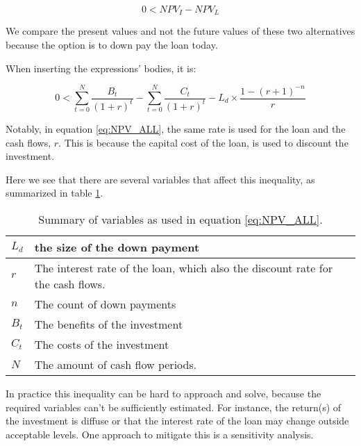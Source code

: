 \documentclass[a4paper]{article}
\begin{document}
\begin{equation}
0 < NPV_I - NPV_L
\end{equation}

We compare the present values and not the future values of these two
alternatives because the option is to down pay the loan today.

When inserting the expressions' bodies, it is:

\begin{equation}
\label{eq:NPV_ALL}
0 < {\sum_{t=0}^{N} \frac{B_t}{(1 + r)^t} -
     \sum_{t=0}^{N} \frac{C_t}{(1 + r)^t}}
     - L_d \times \frac{1 - (r + 1)^{-n}}{r}
\end{equation}

Notably, in equation \ref{eq:NPV_ALL}, the same rate is used for the loan and
the cash flows, $r$. This is because the capital cost of the loan, is used to
discount the investment.

Here we see that there are several variables that affect this inequality, as
summarized in table \ref {Table:variables}.

\begin{table}
\begin{center}
\caption{Summary of variables as used in equation \ref{eq:NPV_ALL}.}
\label{Table:variables}
\begin{tabular}{ |l|p{4in}| }
 \hline
$L_d$  & the size of the down payment                                      \\
\hline
$r$    & The interest rate of the loan, which also the discount rate for the
         cash flows.                                                       \\
\hline
$n$    & The count of down payments                                        \\
\hline
$B_t$  & The benefits of the investment                                    \\
\hline
$C_t$  & The costs of the investment                                       \\
\hline
$N$    & The amount of cash flow periods.                                  \\
 \hline
\end{tabular}
\end{center}
\end{table}

In practice this inequality can be hard to approach and solve, because the
required variables can't be sufficiently estimated. For instance, the return(s)
of the investment is diffuse or that the interest rate of the loan may change
outside acceptable levels. One approach to mitigate this is a sensitivity
analysis.
\end{document}
